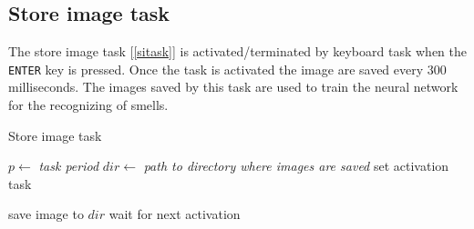 \documentclass[12pt]{article}
\begin{document}
\subsection{Store image task}
The store image task [\ref{sitask}] is activated/terminated by keyboard task
when the \texttt{ENTER} key is pressed. Once the task is activated the image
are saved every $300$ milliseconds. The images saved by this task are used to
train the neural network for the recognizing of smells.

\begin{algorithm}[t]
\caption{Store image task}
\label{sitask}

\begin{algorithmic}
\State $p\gets$ \textit{task period}
\State $dir\gets$ \textit{path to directory where images are saved}
\State set activation task

\Loop
\State save image to $dir$
\State wait for next activation
\EndLoop

\end{algorithmic}
\end{algorithm}
\end{document}
